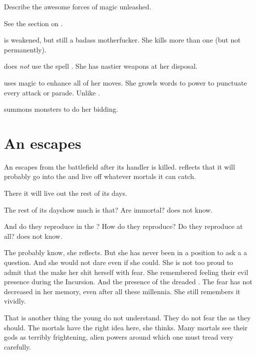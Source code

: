 Describe the awesome forces of magic unleashed.

See the section on .

\Nzessuacrith{} is weakened, but still a badass motherfucker. 
She kills more than one \resphan{} (but not permanently). 

\Nzessuacrith{} does \emph{not} use the spell . 
She has nastier weapons at her disposal. 

\Nzessuacrith{} uses magic to enhance all of her moves. 
She growls words to power to punctuate every attack or parade. 
Unlike \Ishnaruchaefir. 

\Nzessuacrith summons monsters to do her bidding.






\section{An \umbra escapes}
An \umbra{} escapes from the battlefield after its handler is killed. 
\Achsah{} reflects that it will probably go into the \Wylde{} and live off whatever mortals it can catch. 

There it will live out the rest of its days. 

The rest of its days\prikker how much is that? 
Are \umbrae{} immortal? 
\Achsah{} does not know. 

And do they reproduce in the \Wylde{}?
How do they reproduce? 
Do they reproduce at all? 
\Achsah{} does not know. 

The \banelords{} probably know, she reflects. 
But she has never been in a position to ask a \banelord{} a question. 
And she would not dare even if she could. 
She is not too proud to admit that the \banelords{} make her shit herself with fear. 
She remembered feeling their evil presence during the Incursion. 
And the presence of the dreaded \Voidbringer. 
The fear has not decreased in her memory, even after all these millennia. 
She still remembers it vividly. 

That is another thing the young \resphain{} do not understand. 
They do not fear the \banes{} as they should. 
The mortals have the right idea here, she thinks. 
Many mortals see their gods as terribly frightening, alien powers around which one must tread very carefully.

